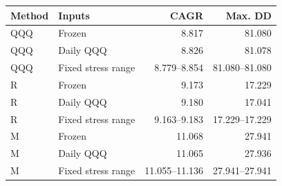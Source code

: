 \begin{tabular}{@{}llrr@{}}\toprule
Method & Inputs & CAGR & Max. DD\\\midrule
QQQ & Frozen & 8.817 & 81.080\\
QQQ & Daily QQQ & 8.826 & 81.078\\
QQQ & Fixed stress range & 8.779--8.854 & 81.080--81.080\\
R & Frozen & 9.173 & 17.229\\
R & Daily QQQ & 9.180 & 17.041\\
R & Fixed stress range & 9.163--9.183 & 17.229--17.229\\
M & Frozen & 11.068 & 27.941\\
M & Daily QQQ & 11.065 & 27.936\\
M & Fixed stress range & 11.055--11.136 & 27.941--27.941\\
\bottomrule\end{tabular}
